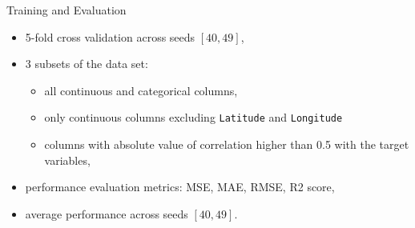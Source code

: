 \documentclass[xcolor=table]{beamer} %
\begin{document}
\begin{frame}{Training and Evaluation}
  \vspace{-1cm}
  \begin{itemize}
      \item 5-fold cross validation across seeds $[40, 49]$,
      \item 3 subsets of the data set:
        \begin{itemize}
            \item all continuous and categorical columns,
            \item only continuous columns excluding \texttt{Latitude} and \texttt{Longitude}
            \item columns with absolute value of correlation higher than 0.5 with the target variables,
        \end{itemize}
      \item performance evaluation metrics: MSE, MAE, RMSE, R2 score,
      \item average performance across seeds $[40, 49]$.
  \end{itemize}
\end{frame}
\end{document}
